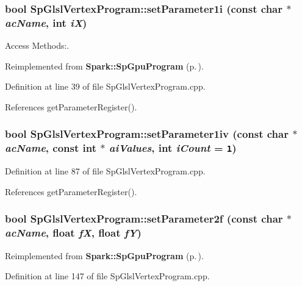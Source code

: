 \subsubsection{\setlength{\rightskip}{0pt plus 5cm}bool Sp\-Glsl\-Vertex\-Program::set\-Parameter1i (const char $\ast$ {\em ac\-Name}, int {\em i\-X})\hspace{0.3cm}{\tt  [virtual]}}\label{classSpark_1_1SpGlslVertexProgram_a1}


Access Methods:. 



Reimplemented from {\bf Spark::Sp\-Gpu\-Program} {\rm (p.\,\pageref{classSpark_1_1SpGpuProgram_a12})}.

Definition at line 39 of file Sp\-Glsl\-Vertex\-Program.cpp.

References get\-Parameter\-Register().
\subsubsection{\setlength{\rightskip}{0pt plus 5cm}bool Sp\-Glsl\-Vertex\-Program::set\-Parameter1iv (const char $\ast$ {\em ac\-Name}, const int $\ast$ {\em ai\-Values}, int {\em i\-Count} = {\tt 1})\hspace{0.3cm}{\tt  [virtual]}}\label{classSpark_1_1SpGlslVertexProgram_a5}


Definition at line 87 of file Sp\-Glsl\-Vertex\-Program.cpp.

References get\-Parameter\-Register().
\subsubsection{\setlength{\rightskip}{0pt plus 5cm}bool Sp\-Glsl\-Vertex\-Program::set\-Parameter2f (const char $\ast$ {\em ac\-Name}, float {\em f\-X}, float {\em f\-Y})\hspace{0.3cm}{\tt  [virtual]}}\label{classSpark_1_1SpGlslVertexProgram_a10}




Reimplemented from {\bf Spark::Sp\-Gpu\-Program} {\rm (p.\,\pageref{classSpark_1_1SpGpuProgram_a21})}.

Definition at line 147 of file Sp\-Glsl\-Vertex\-Program.cpp.

